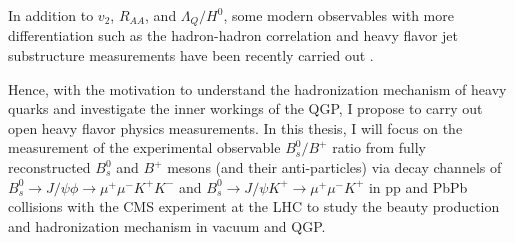 In addition to $v_2$, $R_{AA}$, and $\Lambda_{Q}/H^{0}$, some modern observables with more differentiation such as the hadron-hadron correlation and heavy flavor jet substructure measurements have been recently carried out \cite{DDbar,DJet}. 

Hence, with the motivation to understand the hadronization mechanism of heavy quarks and investigate the inner workings of the QGP, I propose to carry out open heavy flavor physics measurements. In this thesis, I will focus on the measurement of the experimental observable $B^0_s/B^+$ ratio from fully reconstructed $B^0_s$ and $B^+$ mesons (and their anti-particles) via decay channels of $B^0_s \rightarrow J/\psi \phi \rightarrow \mu^+ \mu^- K^+ K^-$ and $B^0_s \rightarrow J/\psi K^+ \rightarrow \mu^+ \mu^- K^+$ in pp and PbPb collisions with the CMS experiment at the LHC to study the beauty production and hadronization mechanism in vacuum and QGP. 



\fi
